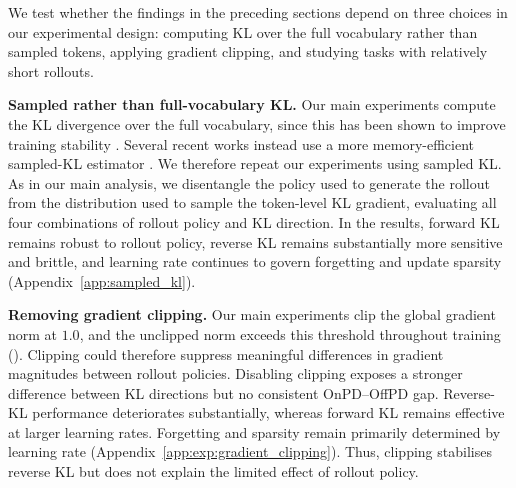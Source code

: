 \documentclass{article} %
\theoremstyle{plain}
\theoremstyle{definition}
\theoremstyle{remark}
\begin{document}
We test whether the findings in the preceding sections depend on three choices in our experimental design: computing KL over the full vocabulary rather than sampled tokens, applying gradient clipping, and studying tasks with relatively short rollouts.


\textbf{Sampled rather than full-vocabulary KL.}
Our main experiments compute the KL divergence over the full vocabulary, since this has been shown to improve training stability \citep{deepseekai2026deepseekv4highlyefficientmilliontoken}. Several recent works instead use a more memory-efficient sampled-KL estimator \citep{lu2025onpolicydistillation,li_rethinking_2026}. We therefore repeat our experiments using sampled KL. As in our main analysis, we disentangle the policy used to generate the rollout from the distribution used to sample the token-level KL gradient, evaluating all four combinations of rollout policy and KL direction. In the results, forward KL remains robust to rollout policy, reverse KL remains substantially more sensitive and brittle, and learning rate continues to govern forgetting and update sparsity (Appendix~\ref{app:sampled_kl}).

\textbf{Removing gradient clipping.} Our main experiments clip the global gradient norm at $1.0$, and the unclipped norm exceeds this threshold throughout training (). Clipping could therefore suppress meaningful differences in gradient magnitudes between rollout policies. Disabling clipping exposes a stronger difference between KL directions but no consistent OnPD--OffPD gap. Reverse-KL performance deteriorates substantially, whereas forward KL remains effective at larger learning rates. Forgetting and sparsity remain primarily determined by learning rate (Appendix~\ref{app:exp:gradient_clipping}). Thus, clipping stabilises reverse KL but does not explain the limited effect of rollout policy.
\end{document}
